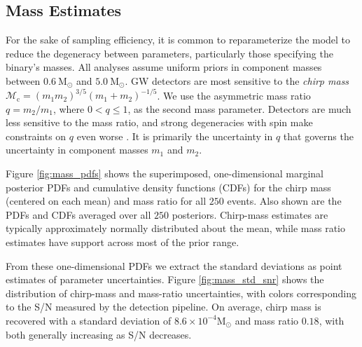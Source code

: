 \subsection{Mass Estimates}

For the sake of sampling efficiency, it is common to reparameterize the model to reduce the degeneracy between parameters, particularly those specifying the binary's masses.  All analyses assume uniform priors in component masses between $0.6~\mathrm{M}_\odot$ and $5.0~\mathrm{M}_\odot$.  GW detectors are most sensitive to the \emph{chirp mass} $\mathcal{M}_\mathrm{c} = (m_1 m_2)^{3/5} (m_1 + m_2)^{-1/5}$.  We use the asymmetric mass ratio $q = m_2/m_1$, where $0 < q \leq 1$, as the second mass parameter.  Detectors are much less sensitive to the mass ratio, and strong degeneracies with spin make constraints on $q$ even worse \citep{Cutler_1994}.  It is primarily the uncertainty in $q$ that governs the uncertainty in component masses $m_1$ and $m_2$.

Figure \ref{fig:mass_pdfs} shows the superimposed, one-dimensional marginal posterior PDFs and cumulative density functions (CDFs) for the chirp mass (centered on each mean) and mass ratio for all $250$ events.  Also shown are the PDFs and CDFs averaged over all $250$ posteriors. Chirp-mass estimates are typically approximately normally distributed about the mean, while mass ratio estimates have support across most of the prior range.

From these one-dimensional PDFs we extract the standard deviations as point estimates of parameter uncertainties.  Figure \ref{fig:mass_std_snr} shows the distribution of chirp-mass and mass-ratio uncertainties, with colors corresponding to the S/N measured by the detection pipeline. On average, chirp mass is recovered with a standard deviation of $8.6 \times 10^{-4} \mathrm{M}_\odot$ and mass ratio $0.18$, with both generally increasing as S/N decreases.